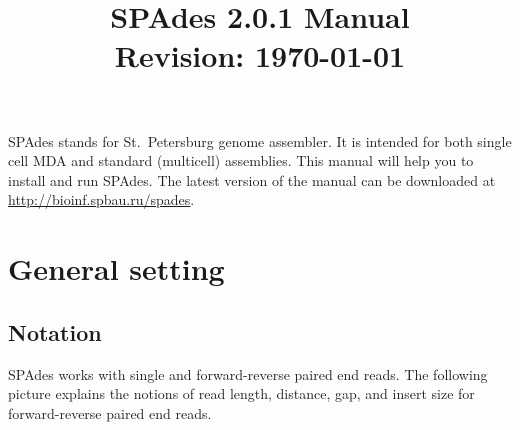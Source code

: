 \documentclass{article}
\def\spades{SPAdes}
\begin{document}
\sloppy

\title{{\spades} 2.0.1 Manual\\{\small 
  Revision: \today}}
\date{}
\author{}
\maketitle

{\spades} stands for St.~Petersburg genome assembler.
It is intended for both single cell MDA and standard (multicell) 
assemblies. 
This manual will help you to install and run
{\spades}. The latest version of the manual can be downloaded at \url{http://bioinf.spbau.ru/spades}.


\renewcommand{\contentsname}{}
\tableofcontents



\pagebreak

\section{General setting}
\subsection{Notation}
{\spades} works with single and forward-reverse paired end reads.
The following picture explains the notions of 
read length, distance, gap, and insert size
for forward-reverse paired end reads.

\begin{center}
\end{center}
\end{document}
